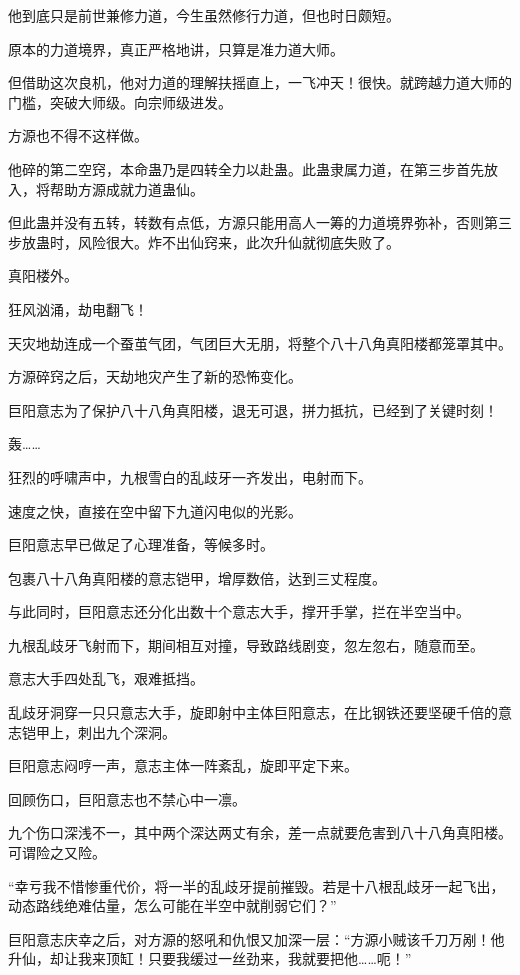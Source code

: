 \begin{this_body}
他到底只是前世兼修力道，今生虽然修行力道，但也时日颇短。

原本的力道境界，真正严格地讲，只算是准力道大师。

但借助这次良机，他对力道的理解扶摇直上，一飞冲天！很快。就跨越力道大师的门槛，突破大师级。向宗师级进发。

方源也不得不这样做。

他碎的第二空窍，本命蛊乃是四转全力以赴蛊。此蛊隶属力道，在第三步首先放入，将帮助方源成就力道蛊仙。

但此蛊并没有五转，转数有点低，方源只能用高人一筹的力道境界弥补，否则第三步放蛊时，风险很大。炸不出仙窍来，此次升仙就彻底失败了。

真阳楼外。

狂风汹涌，劫电翻飞！

天灾地劫连成一个蚕茧气团，气团巨大无朋，将整个八十八角真阳楼都笼罩其中。

方源碎窍之后，天劫地灾产生了新的恐怖变化。

巨阳意志为了保护八十八角真阳楼，退无可退，拼力抵抗，已经到了关键时刻！

轰……

狂烈的呼啸声中，九根雪白的乱歧牙一齐发出，电射而下。

速度之快，直接在空中留下九道闪电似的光影。

巨阳意志早已做足了心理准备，等候多时。

包裹八十八角真阳楼的意志铠甲，增厚数倍，达到三丈程度。

与此同时，巨阳意志还分化出数十个意志大手，撑开手掌，拦在半空当中。

九根乱歧牙飞射而下，期间相互对撞，导致路线剧变，忽左忽右，随意而至。

意志大手四处乱飞，艰难抵挡。

乱歧牙洞穿一只只意志大手，旋即射中主体巨阳意志，在比钢铁还要坚硬千倍的意志铠甲上，刺出九个深洞。

巨阳意志闷哼一声，意志主体一阵紊乱，旋即平定下来。

回顾伤口，巨阳意志也不禁心中一凛。

九个伤口深浅不一，其中两个深达两丈有余，差一点就要危害到八十八角真阳楼。可谓险之又险。

“幸亏我不惜惨重代价，将一半的乱歧牙提前摧毁。若是十八根乱歧牙一起飞出，动态路线绝难估量，怎么可能在半空中就削弱它们？”

巨阳意志庆幸之后，对方源的怒吼和仇恨又加深一层：“方源小贼该千刀万剐！他升仙，却让我来顶缸！只要我缓过一丝劲来，我就要把他……呃！”


\end{this_body}
